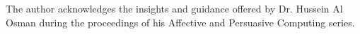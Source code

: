 \documentclass[sigplan,screen]{acmart}
\begin{document}

\maketitle







\begin{acks}
The author acknowledges the insights and guidance offered by Dr. Hussein Al Osman during the proceedings of his Affective and Persuasive Computing series.
\end{acks}



\end{document}
